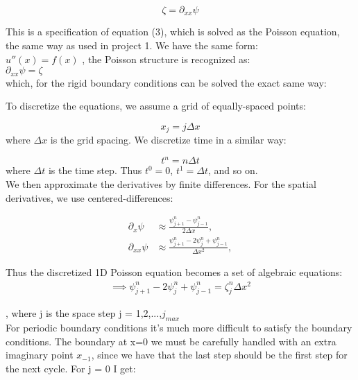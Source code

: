 \begin{equation}
\zeta = \partial_{xx}\psi
\end{equation} 

This is a specification of equation (3), which is solved as the Poisson equation, the same way as used in project 1. We have the same form:\\

$u''(x) = f(x)$ , the Poisson structure is recognized as:\\

$\partial_{xx} \psi = \zeta$\\

which, for the rigid boundary conditions can be solved the exact same way: 

To discretize the equations, we assume a grid of equally-spaced
points:

\begin{equation}
x_j = j\Delta x
\end{equation}
where $\Delta x$ is the grid spacing. We discretize time in a similar way:

\begin{equation}
t^n = n\Delta t
\end{equation}
where $\Delta t$ is the time step. Thus $t^0=0$, $t^1=\Delta t$, and so on.\\

We then approximate the derivatives by finite differences. For
the spatial derivatives, we use centered-differences:

\begin{align}
	\partial_x\psi &\approx \frac{\psi_{j+1}^{n} - \psi_{j-1}^{n}}{2\Delta x}, \\
	\partial_{xx}\psi &\approx \frac{\psi_{j+1}^{n} - 2\psi_{j}^{n} + \psi_{j-1}^{n}}{\Delta x^2},
\end{align}

Thus the discretized 1D Poisson equation becomes a set of algebraic equations:\\


\begin{align}
\implies \psi_{j+1}^{n} - 2\psi_{j}^{n} + \psi_{j-1}^{n} = \zeta_j^n {\Delta x^2}
\end{align}

, where j is the space step j = 1,2,...,$j_{max}$\\

For periodic boundary conditions it's much more difficult to satisfy the boundary conditions. The boundary at x=0 we must be carefully handled with an extra imaginary point $x_{-1}$, since we have that the last step should be the first step for the next cycle. For j = 0 I get:\\

